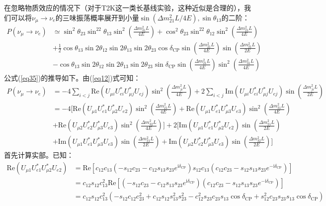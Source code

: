 \documentclass{article}
\newcommand{\ii}{\mathrm{i}}
\begin{document}
	在忽略物质效应的情况下（对于T2K这一类长基线实验，这种近似是合理的），我们可以将$\nu_\mu\to\nu_e$的三味振荡概率展开到小量$\sin(\Delta m_{21}^2L/4E),\sin\theta_{13}$的二阶：
	\begin{equation}
		\begin{aligned}P(\nu_\mu\to\nu_e)&\simeq\sin^2\theta_{23}\sin^22\theta_{13}\sin^2\left(\frac{\Delta m_{31}^2L}{4E}\right)+\cos^2\theta_{23}\sin^22\theta_{12}\sin^2\left(\frac{\Delta m_{21}^2L}{4E}\right)\\&+\frac{1}{2}\cos\theta_{13}\sin2\theta_{12}\sin2\theta_{13}\sin2\theta_{23}\cos\delta_{\mathrm{CP}}\sin\left(\frac{\Delta m_{21}^2L}{4E}\right)\sin\left(\frac{\Delta m_{31}^2L}{2E}\right)\\&-\cos\theta_{13}\sin2\theta_{12}\sin2\theta_{13}\sin2\theta_{23}\sin\delta_{\mathrm{CP}}\sin\left(\frac{\Delta m_{21}^2L}{4E}\right)\sin^2\left(\frac{\Delta m_{31}^2L}{4E}\right)
		\end{aligned}
		\label{eq35}
	\end{equation}
	公式(\ref{eq35})的推导如下。由(\ref{eq12})式可知：
	\begin{equation*}
		\begin{aligned}
			P(\nu_\mu\to\nu_e)&=-4\sum_{i<j}\mathrm{Re}(U_{\mu i}U_{ei}^*U_{\mu j}^*U_{ej})\sin^2\left(\frac{\Delta m_{ji}^2L}{4E}\right)+2\sum_{i<j}\mathrm{Im}(U_{\mu i}U_{ei}^*U_{\mu j}^*U_{ej})\sin\left(\frac{\Delta m_{ji}^2L}{2E}\right)\\
			&=-4\Bigg[\mathrm{Re}(U_{\mu 1}U_{e1}^*U_{\mu 2}^*U_{e2})\sin^2\left(\frac{\Delta m_{21}^2L}{4E}\right)+\mathrm{Re}(U_{\mu 1}U_{e1}^*U_{\mu 3}^*U_{e3})\sin^2\left(\frac{\Delta m_{31}^2L}{4E}\right)\\
			&+\mathrm{Re}(U_{\mu 2}U_{e2}^*U_{\mu 3}^*U_{e3})\sin^2\left(\frac{\Delta m_{32}^2L}{4E}\right)\Bigg]+2\Bigg[\mathrm{Im}(U_{\mu 1}U_{e1}^*U_{\mu 2}^*U_{e2})\sin\left(\frac{\Delta m_{21}^2L}{2E}\right)\\
			&+\mathrm{Im}(U_{\mu 1}U_{e1}^*U_{\mu 3}^*U_{e3})\sin\left(\frac{\Delta m_{31}^2L}{2E}\right)+\mathrm{Im}(U_{\mu 2}U_{e2}^*U_{\mu 3}^*U_{e3})\sin\left(\frac{\Delta m_{32}^2L}{2E}\right)\Bigg]
		\end{aligned}
	\end{equation*}
	首先计算实部。已知：
	\begin{equation*}
		\begin{aligned}
			\mathrm{Re}(U_{\mu 1}U_{e1}^*U_{\mu 2}^*U_{e2})&=\mathrm{Re}\left[c_{12}c_{13}(-s_{12}c_{23}-c_{12}s_{13}s_{23}e^{\ii\delta_{\mathrm{CP}}})s_{12}c_{13}(c_{12}c_{23}-s_{12}s_{13}s_{23}e^{-\ii\delta_{\mathrm{CP}}})\right]\\
			&=c_{12}s_{12}c_{13}^2\mathrm{Re}\left[(-s_{12}c_{23}-c_{12}s_{13}s_{23}e^{\ii\delta_{\mathrm{CP}}})(c_{12}c_{23}-s_{12}s_{13}s_{23}e^{-\ii\delta_{\mathrm{CP}}})\right]\\
			&=c_{12}s_{12}c_{13}^2(-s_{12}c_{12}c_{23}^2+c_{12}s_{12}s_{13}^2s_{23}^2-c_{12}^2s_{23}c_{23}s_{13}\cos\delta_\mathrm{CP}+s_{12}^2c_{23}s_{23}s_{13}\cos\delta_\mathrm{CP})
		\end{aligned}
	\end{equation*}
\end{document}
